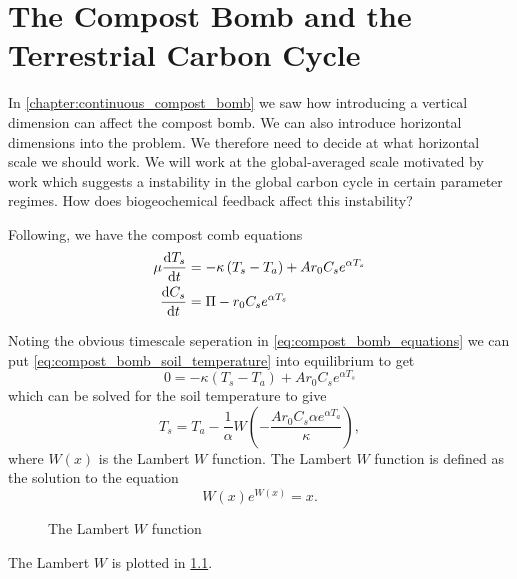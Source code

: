 \chapter{The Compost Bomb and the Terrestrial Carbon Cycle}
\label{chapter:global_bomb}
\graphicspath{{global_bomb/figs/}}



In \cref{chapter:continuous_compost_bomb} we saw how introducing a vertical dimension can affect the compost bomb.
We can also introduce horizontal dimensions into the problem. We therefore need to decide at what horizontal scale we
should work. We will work at the global-averaged scale motivated by work\cite{Cox2006} which suggests a instability in the global
carbon cycle in certain parameter regimes. How does biogeochemical feedback affect this instability?

Following\cite{Luke2011}, we have the compost comb equations
\begin{subequations}
  \label{eq:compost_bomb_equations}
  \begin{align}
    \mu \dv{T_s}{t} &= - \kappa \left(T_s - T_a\right) + Ar_0C_se^{\alpha T_s} \label{eq:compost_bomb_soil_temperature} \\
    \dv{C_s}{t} &= \Pi - r_0C_se^{\alpha T_s} \label{eq:compost_bomb_soil_carbon}
  \end{align}
\end{subequations}

Noting the obvious timescale seperation in \cref{eq:compost_bomb_equations} we can put \cref{eq:compost_bomb_soil_temperature} into
equilibrium to get
\begin{equation*}
  0 = - \kappa \left(T_s - T_a\right) + Ar_0C_se^{\alpha T_s}
\end{equation*}
which can be solved for the soil temperature to  give
\begin{equation}
  \label{eq:soil_temperature_equilibrium}
  T_s = T_a - \frac{1}{\alpha} W\left(-\frac{Ar_0C_s \alpha e^{\alpha T_a}}{\kappa} \right),
\end{equation}
where $W(x)$ is the Lambert $W$ function. The Lambert $W$ function is defined as the solution to the equation
\begin{equation}
  \label{eq:lambert_W}
  W(x)e^{W(x)} = x.
\end{equation}

\begin{figure}
  \centering
  \caption{The Lambert $W$ function}
  \label{fig:lambert_W}
\end{figure}
The Lambert $W$ is plotted in \cref{fig:lambert_W}.

